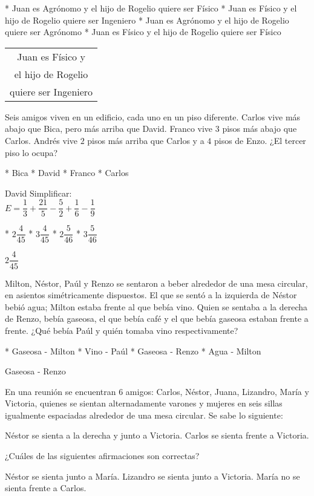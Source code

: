 \begin{enum}
	* Juan es Agr\'onomo y el hijo de Rogelio quiere ser F\'isico
	* Juan es F\'isico y el hijo de Rogelio quiere ser Ingeniero
	* Juan es Agr\'onomo y el hijo de Rogelio quiere ser Agr\'onomo
	* Juan es F\'isico y el hijo de Rogelio quiere ser F\'isico
\end{enum}
\begin{tabular}{c}
	Juan es F\'isico y \\
	el hijo de Rogelio \\
	quiere ser Ingeniero
\end{tabular}
\begin{mini}[.7]
	Seis amigos viven en un edificio, cada uno en un piso diferente. Carlos vive m\'as abajo que Bica, pero m\'as arriba que David. Franco vive $3$ pisos m\'as abajo que Carlos. Andr\'es vive $2$ pisos m\'as arriba que Carlos y a $4$ pisos de Enzo. ¿El tercer piso lo ocupa?
\end{mini}
\begin{task}
	* Bica
	* David
	* Franco
	* Carlos
\end{task}
David
Simplificar: \vspace{5pt} \\
$E=\dfrac{1}{3}+\dfrac{21}{5}-\dfrac{5}{2}+\dfrac{1}{6}-\dfrac{1}{9}$
\begin{task}
	* $2\dfrac{4}{45}$
	* $3\dfrac{4}{45}$
	* $2\dfrac{5}{46}$
	* $3\dfrac{5}{46}$
\end{task}
$2\dfrac{4}{45}$
\begin{mini}[.8]
	Milton, N\'estor, Pa\'ul y Renzo se sentaron a beber alrededor de una mesa circular, en asientos sim\'etricamente dispuestos. El que se sent\'o a la izquierda de N\'estor bebi\'o agua; Milton estaba frente al que beb\'ia vino. Quien se sentaba a la derecha de Renzo, beb\'ia gaseosa, el que beb\'ia caf\'e y el que beb\'ia gaseosa estaban frente a frente. ¿Qu\'e beb\'ia Pa\'ul y qui\'en tomaba vino respectivamente?
\end{mini}
\begin{enum}
	* Gaseosa - Milton
	* Vino - Pa\'ul
	* Gaseosa - Renzo
	* Agua - Milton
\end{enum}
Gaseosa - Renzo
\begin{mini}[.9]
	En una reuni\'on se encuentran $6$ amigos: Carlos, N\'estor, Juana, Lizandro, Mar\'ia y Victoria, quienes se sientan alternadamente varones y mujeres en seis sillas igualmente espaciadas alrededor de una mesa circular. Se sabe lo siguiente:
	\begin{itemize}
		\ii N\'estor se sienta a la derecha y junto a Victoria.
		\ii Carlos se sienta frente a Victoria.
	\end{itemize}
	¿Cu\'ales de las siguientes afirmaciones son correctas?
	\begin{enumerate}[label=\Roman*)]
		\ii N\'estor se sienta junto a Mar\'ia.
		\ii Lizandro se sienta junto a Victoria.
		\ii Mar\'ia no se sienta frente a Carlos.
	\end{enumerate}
\end{mini}
